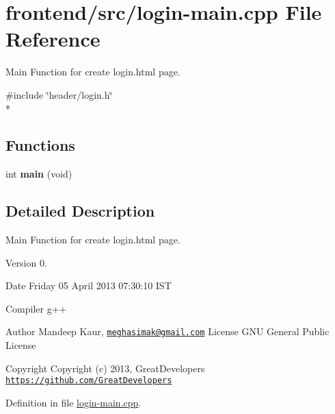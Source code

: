 \hypertarget{login-main_8cpp}{\section{frontend/src/login-\/main.cpp File Reference}
\label{login-main_8cpp}
}


Main Function for create login.\-html page.  


{\ttfamily \#include \char`\"{}header/login.\-h\char`\"{}}\\*
\subsection*{Functions}
\begin{DoxyCompactItemize}
\item 
\hypertarget{login-main_8cpp_a840291bc02cba5474a4cb46a9b9566fe}{int {\bfseries main} (void)}\label{login-main_8cpp_a840291bc02cba5474a4cb46a9b9566fe}

\end{DoxyCompactItemize}


\subsection{Detailed Description}
Main Function for create login.\-html page. \begin{DoxyVersion}{Version}
0. 
\end{DoxyVersion}
\begin{DoxyDate}{Date}
Friday 05 April 2013 07\-:30\-:10 I\-S\-T\par
 Compiler g++
\end{DoxyDate}
\begin{DoxyAuthor}{Author}
Mandeep Kaur, \href{mailto:meghasimak@gmail.com}{\tt meghasimak@gmail.\-com} License G\-N\-U General Public License 
\end{DoxyAuthor}
\begin{DoxyCopyright}{Copyright}
Copyright (c) 2013, Great\-Developers \href{https://github.com/GreatDevelopers}{\tt https\-://github.\-com/\-Great\-Developers} 
\end{DoxyCopyright}


Definition in file \hyperlink{login-main_8cpp_source}{login-\/main.\-cpp}.

